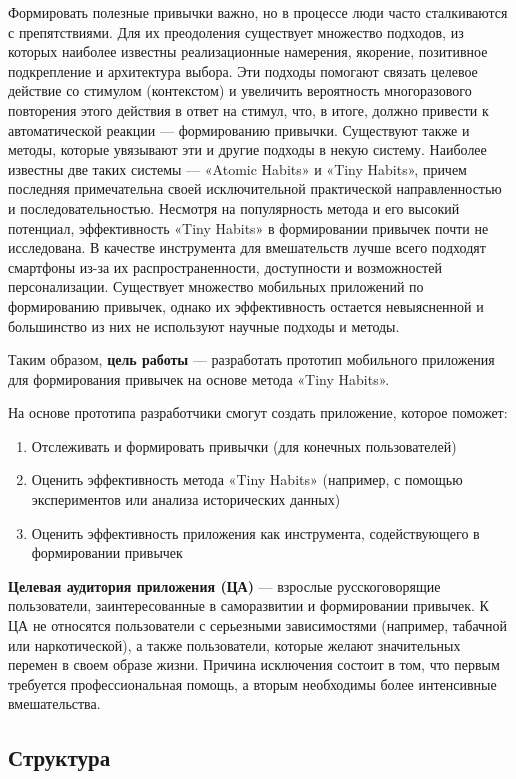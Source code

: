 \documentclass[pdflatex,sn-mathphys-num]{sn-jnl}%
\theoremstyle{thmstyleone}%
\theoremstyle{thmstyletwo}%
\theoremstyle{thmstylethree}%
\begin{document}
Формировать полезные привычки важно, но в процессе люди часто сталкиваются с препятствиями. Для их преодоления существует множество подходов, из которых наиболее известны реализационные намерения, якорение, позитивное подкрепление и архитектура выбора. Эти подходы помогают связать целевое действие со стимулом (контекстом) и увеличить вероятность многоразового повторения этого действия в ответ на стимул, что, в итоге, должно привести к автоматической реакции — формированию привычки. Существуют также и методы, которые увязывают эти и другие подходы в некую систему. Наиболее известны две таких системы — «Atomic Habits» и «Tiny Habits», причем последняя примечательна своей исключительной практической направленностью и последовательностью. Несмотря на популярность метода и его высокий потенциал, эффективность «Tiny Habits» в формировании привычек почти не исследована. В качестве инструмента для вмешательств лучше всего подходят смартфоны из-за их распространенности, доступности и возможностей персонализации. Существует множество мобильных приложений по формированию привычек, однако их эффективность остается невыясненной и большинство из них не используют научные подходы и методы.

Таким образом, \textbf{цель работы} — разработать прототип мобильного приложения для формирования привычек на основе метода «Tiny Habits».

На основе прототипа разработчики смогут создать приложение, которое поможет:

\begin{enumerate}
    \item Отслеживать и формировать привычки (для конечных пользователей)
    \item Оценить эффективность метода «Tiny Habits» (например, с помощью экспериментов или анализа исторических данных)
    \item Оценить эффективность приложения как инструмента, содействующего в формировании привычек
\end{enumerate}

\textbf{Целевая аудитория приложения (ЦА)} — взрослые русскоговорящие пользователи, заинтересованные в саморазвитии и формировании привычек. К ЦА не относятся пользователи с серьезными зависимостями (например, табачной или наркотической), а также пользователи, которые желают значительных перемен в своем образе жизни. Причина исключения состоит в том, что первым требуется профессиональная помощь, а вторым необходимы более интенсивные вмешательства.

\subsection{Структура}\label{Structure}
\end{document}
